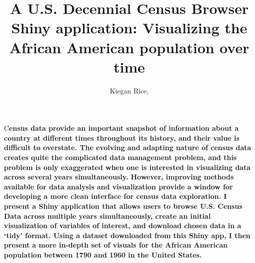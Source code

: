 \documentclass[DIV=calc, paper=a4, fontsize=10pt, twocolumn]{scrartcl}\usepackage[]{graphicx}\usepackage[]{color}
\title{A U.S. Decennial Census Browser Shiny application: Visualizing the African American population over time} %
\author{Kiegan Rice, } %
\date{} %
\newcommand{\initial}[1]{ %
\lettrine[lines=3,lhang=0.3,nindent=0em]{
\color{black}
{\textsf{#1}}}{}}
\newcommand{\st}[1]{{\color{purple} #1}}
\begin{document}


\maketitle %

\thispagestyle{fancy} %


\vspace{-1cm}


\initial{C}\textbf{ensus data provide an important snapshot of information about a country at different times throughout its history, and their value is difficult to overstate. The evolving and adapting nature of census data creates quite the complicated data management problem, and this problem is only exaggerated when one is interested in visualizing data across several years simultaneously. However, improving methods available for data analysis and visualization provide a window for developing a more clean interface for census data exploration. I present a Shiny application that allows users to browse U.S. Census Data across multiple years simultaneously, create an initial visualization of variables of interest, and download chosen data in a `tidy' format. Using a dataset downloaded from this Shiny app, I then present a more in-depth set of visuals for the African American population between 1790 and 1960 in the United States.}  
\end{document}
